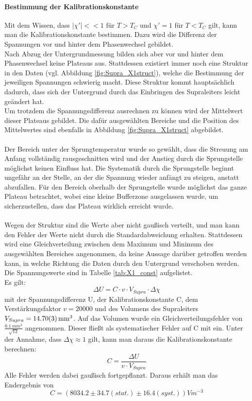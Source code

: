 \documentclass[12pt,a4paper]{article}
\begin{document}
\paragraph{Bestimmung der Kalibrationskonstante}
Mit dem Wissen, dass $|\chi'| << 1$ für $T>T_C$ und $\chi' = 1$ für $T<T_C$ gilt, kann man die Kalibrationskonstante bestimmen. Dazu wird die Differenz der Spannungen vor und hinter dem Phasenwechsel gebildet.\\
Nach Abzug der Untergrundmessung bilden sich aber vor und hinter dem Phasenwechsel keine Plateaus aus. Stattdessen existiert immer noch eine Struktur in den Daten (vgl. Abbildung \ref{fig:Supra_X1struct}), welche die Bestimmung der jeweiligen Spannungen schwierig macht. Diese Struktur kommt hauptsächlich dadurch, dass sich der Untergrund durch das Einbringen des Supraleiters leicht geändert hat.\\
Um trotzdem die Spannungsdifferenz ausrechnen zu können wird der Mittelwert dieser Plateaus gebildet. Die dafür ausgewählten Bereiche und die Position des Mittelwertes sind ebenfalls in Abbildung \ref{fig:Supra_X1struct} abgebildet.\\
\\
Der Bereich unter der Sprungtemperatur wurde so gewählt, dass die Streuung am Anfang vollständig rausgeschnitten wird und der Anstieg durch die Sprungstelle möglichst keinen Einfluss hat. Die Systematik durch die Sprungstelle beginnt ungefähr an der Stelle, an der die Spannung wieder anfängt zu steigen, anstatt abzufallen. Für den Bereich oberhalb der Sprungstelle wurde möglichst das ganze Plateau betrachtet, wobei eine kleine Bufferzone ausgelassen wurde, um sicherzustellen, dass das Plateau wirklich erreicht wurde.\\
\\
Wegen der Struktur sind die Werte aber nicht gaußisch verteilt, und man kann den Fehler der Werte nicht durch die Standardabweichung erhalten. Stattdessen wird eine Gleichverteilung zwischen dem Maximum und Minimum des ausgewählten Bereiches angenommen, da keine Aussage darüber getroffen werden kann, in welche Richtung die Daten durch den Untergrund verschoben werden. Die Spannungswerte sind in Tabelle \ref{tab:X1_const} aufgelistet.\\
Es gilt:
\begin{equation*}
\Delta U = C \cdot v \cdot V_{Supra} \cdot \Delta\chi
\end{equation*}
mit der Spannungsdifferenz U, der Kalibrationskonstante C, dem Verstärkungsfaktor $v=20000$ und des Volumens des Supraleiters $V_{Supra} =\SI{ 14.7\pm 0.03}{mm^3}$. Auf das Volumen wurde ein Gleichverteilungsfehler von $\frac{\SI{0,1}{mm^3}}{\sqrt{12}}$ angenommen. Dieser fließt als systematischer Fehler auf C mit ein. Unter der Annahme, dass $\Delta\chi \approx 1$ gilt, kann man daraus die Kalibrationskonstante berechnen:
\begin{equation*}
C = \dfrac{\Delta U}{v\cdot V_{Supra}}
\end{equation*}
Alle Fehler werden dabei gaußisch fortgepflanzt. Daraus erhält man das Endergebnis von
\begin{equation*}
C = (8034.2\pm 34.7(stat.)\pm 16.4(syst.))\si{Vm^{-3}}
\end{equation*}
\end{document}

